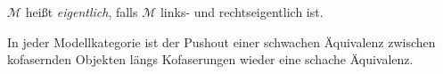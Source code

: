 \documentclass{cheat-sheet}
\newcommand{\ModC}{\mathcal{M}} %
\newenvironment{centertikzcd}
  {\begin{center}\begin{tikzcd}}
  {\end{tikzcd}\end{center}}
\begin{document}
\begin{defn}
  $\ModC$ heißt \emph{eigentlich}, falls $\ModC$ links- und rechtseigentlich ist.
\end{defn}

\begin{prop}
  In jeder Modellkategorie ist der Pushout einer schwachen Äquivalenz zwischen kofasernden Objekten längs Kofaserungen wieder eine schache Äquivalenz.
\end{prop}



\pagebreak

\end{document}
